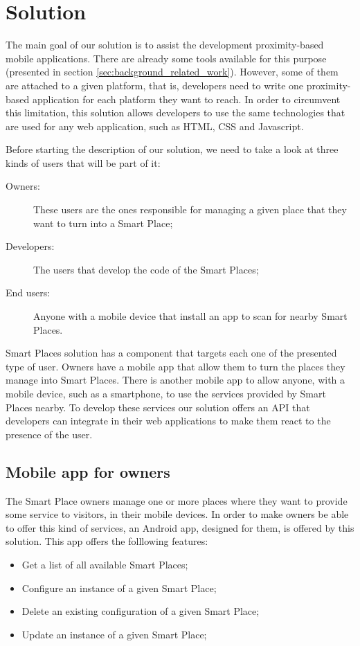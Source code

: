 
\chapter{Solution}
\label{chapter:solution}
The main goal of our solution is to assist
the development proximity-based mobile applications.
There are already some tools available for this purpose (presented in section \ref{sec:background_related_work}).
However, some of them are attached to a given platform, that is, developers
need to write one proximity-based application for each platform they want
to reach.
In order to circumvent this limitation, this solution allows developers
to use the same technologies that are used for any web application, such as \gls{HTML}, \gls{CSS} and Javascript.

Before starting the description of our solution, we need to take a look at three kinds of users that will be part of it:
\begin{description}
  \item[Owners:] These users are the ones responsible for managing a given place that they want to turn into a Smart Place;
  \item[Developers:] The users that develop the code of the Smart Places;
  \item[End users:] Anyone with a mobile device that install an app to scan for nearby Smart Places.
\end{description}

Smart Places solution has a component that targets each one of the presented type of user.
Owners have a mobile app that allow them to turn the places they manage into Smart Places.
There is another mobile app to allow anyone, with a mobile device, such as a smartphone, to use the services provided by Smart Places nearby.
To develop these services our solution offers an \gls{API} that developers can integrate in their web applications to make them react to the presence of the user.

\section{Mobile app for owners}
\label{sec:solution_mobile_app_for_owners}
The Smart Place owners manage one or more places where they want to provide some service to visitors, in their mobile devices.
In order to make owners be able to offer this kind of services, an Android app, designed for them, is offered by this solution.
This app offers the folllowing features:
\begin{itemize}
  \item Get a list of all available Smart Places;
  \item Configure an instance of a given Smart Place;
  \item Delete an existing configuration of a given Smart Place;
  \item Update an instance of a given Smart Place;
\end{itemize}

